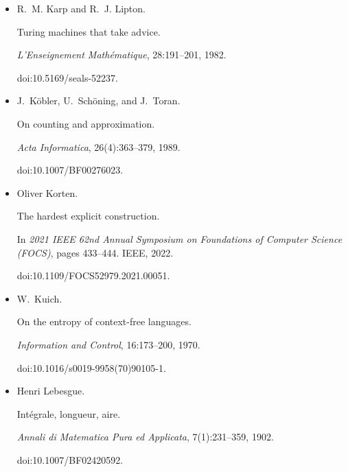 \begin{itemize}
doi:10.1145/335305.335314.





\item[] 
[40]

R. M. Karp and R. J. Lipton.


Turing machines that take advice.


\emph{L’Enseignement Mathématique}, 28:191–201, 1982.


doi:10.5169/seals-52237.





\item[] 
[41]

J. Köbler, U. Schöning, and J. Toran.


On counting and approximation.


\emph{Acta Informatica}, 26(4):363–379, 1989.


doi:10.1007/BF00276023.





\item[] 
[42]

Oliver Korten.


The hardest explicit construction.


In \emph{2021 IEEE 62nd Annual Symposium on Foundations of Computer
Science (FOCS)}, pages 433–444. IEEE, 2022.


doi:10.1109/FOCS52979.2021.00051.





\item[] 
[43]

W. Kuich.


On the entropy of context-free languages.


\emph{Information and Control}, 16:173–200, 1970.


doi:10.1016/s0019-9958(70)90105-1.





\item[] 
[44]

Henri Lebesgue.


Intégrale, longueur, aire.


\emph{Annali di Matematica Pura ed Applicata}, 7(1):231–359, 1902.


doi:10.1007/BF02420592.






\end{itemize}
